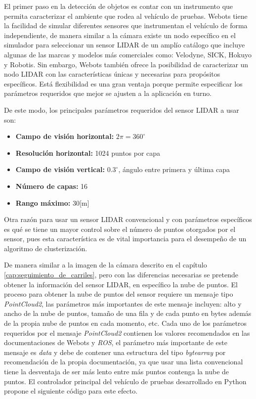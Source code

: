 El primer paso en la detección de objetos es contar con un instrumento que permita caracterizar el ambiente que rodea al vehículo de pruebas. Webots tiene la facilidad de simular diferentes sensores que instrumentan el vehículo de forma independiente, de manera similar a la cámara existe un nodo específico en el simulador para seleccionar un sensor LIDAR de un amplío catálogo que incluye algunas de las marcas y modelos más comerciales como: Velodyne, SICK, Hokuyo y Robotis. Sin embargo, Webots también ofrece la posibilidad de caracterizar un nodo LIDAR con las características únicas y necesarias para propósitos específicos. Está flexibilidad es una gran ventaja porque permite especificar los parámetros requeridos que mejor se ajusten a la aplicación en turno.

De este modo, los principales parámetros requeridos del sensor LIDAR a usar son:
\begin{itemize}
    \item \textbf{Campo de visión horizontal:} $2\pi = 360^{\circ}$
    \item \textbf{Resolución horizontal:} 1024 puntos por capa
    \item \textbf{Campo de visión vertical:} $0.3^{\circ}$, ángulo entre primera y última capa
    \item \textbf{Número de capas:} 16
    \item \textbf{Rango máximo:} 30[m]
\end{itemize}

Otra razón para usar un sensor LIDAR convencional y con parámetros específicos es qué se tiene un mayor control sobre el número de puntos otorgados por el sensor, pues esta característica es de vital importancia para el desempeño de un algoritmo de clusterización.

De manera similar a la imagen de la cámara descrito en el capítulo \ref{cap:seguimiento_de_carriles}, pero con las diferencias necesarias se pretende obtener la información del sensor LIDAR, en específico la nube de puntos. El proceso para obtener la nube de puntos del sensor requiere un mensaje tipo \textit{PointCloud2}, las parámetros más importantes de este mensaje incluyen: alto y ancho de la nube de puntos, tamaño de una fila y de cada punto en bytes además de la propia nube de puntos en cada momento, etc. Cada uno de los parámetros requeridos por el mensaje \textit{PointCloud2} contienen los valores recomendados en las documentaciones de Webots y \textit{ROS}, el parámetro más importante de este mensaje es \textit{data} y debe de contener una estructura del tipo \textit{bytearray} por recomendación de la propia documentación, ya que usar una lista convencional tiene la desventaja de ser más lento entre más puntos contenga la nube de puntos. El controlador principal del vehículo de pruebas desarrollado en Python propone el siguiente código para este efecto.

